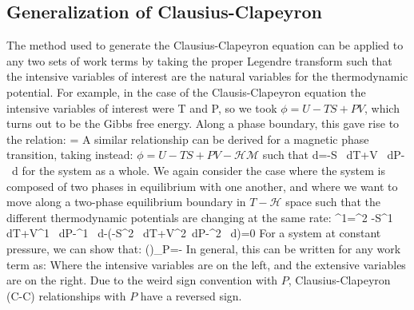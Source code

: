 \documentclass[12pt]{article}
\begin{document}
\subsection{Generalization of Clausius-Clapeyron}
The method used to generate the Clausius-Clapeyron equation can be applied to any two sets of work terms by taking the proper Legendre transform such
that the intensive variables of interest are the natural variables for the thermodynamic potential. For example, in the case of the Clausis-Clapeyron
equation the intensive variables of interest were T and P, so we took $\phi  = U-TS+PV$, which turns out to be the Gibbs free energy. Along a phase boundary, this gave rise to the relation:
\eqs
{}=
\eqe
A similar relationship can be derived for a magnetic phase transition, taking
instead: $\phi  = U - TS + PV - \mathcal{H}\mathcal{M}$ such that
\eqs 
d\phi =-S \, dT+V \, dP- \, d
\eqe
for the system as a whole. We again consider the case where the system is composed of two phases in equilibrium with one another, and where we want to move along a two-phase equilibrium boundary in $T\!-\!\mathcal{H} $ space such that the different thermodynamic potentials are changing at the same rate:
\eqs{}^1=^2\eqe
\eqs
-S^1 \, dT+V^1 \, dP-^1 \, d-\left(-S^2 \, dT+V^2 \,dP-^2 \, d\right)=0
\eqe
For a system at constant pressure, we can show that:
\eqs\left(\right)_P=-\eqe
In general, this can be written for any work term as:
\eqs {}\eqe
Where the intensive variables are on the left, and the extensive variables are on the right. Due to the weird sign convention with $P$, Clausius-Clapeyron (C-C) relationships with $P$ have a reversed sign.
\end{document}
